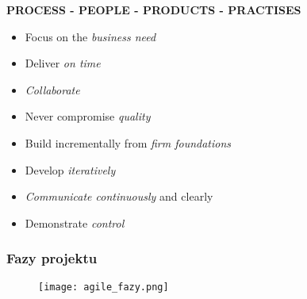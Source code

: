 \documentclass[a4paper]{article}
\begin{document}
    \textbf{PROCESS - PEOPLE - PRODUCTS - PRACTISES}
    \begin{itemize}
        \item Focus on the \textit{business need}
        \item Deliver \textit{on time}
        \item \textit{Collaborate}
        \item Never compromise \textit{quality}
        \item Build incrementally from \textit{firm foundations}
        \item Develop \textit{iteratively}
        \item \textit{Communicate continuously} and clearly
        \item Demonstrate \textit{control}
    \end{itemize}



    \subsubsection{Fazy projektu}
    \begin{figure}[H]
        \texttt{[image: agile\_fazy.png]}
    \end{figure}
\end{document}
